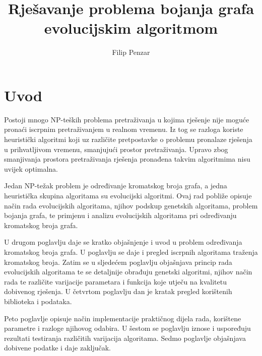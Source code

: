 \documentclass[times, utf8, zavrsni]{fer}
\begin{document}

\title{Rješavanje problema bojanja grafa evolucijskim algoritmom}

\author{Filip Penzar}

\maketitle


\zahvala{}

\tableofcontents

\chapter{Uvod}
Postoji mnogo NP-teških problema pretraživanja u kojima rješenje nije moguće pronaći iscrpnim pretraživanjem u realnom vremenu. Iz tog se razloga koriste heuristički algoritmi koji uz različite pretpostavke o problemu pronalaze rješenja u prihvatljivom vremenu, smanjujući prostor pretraživanja. Upravo zbog smanjivanja prostora pretraživanja rješenja pronađena takvim algoritmima nisu uvijek optimalna.

Jedan NP-težak problem je određivanje kromatskog broja grafa, a jedna heuristička skupina algoritama su evolucijski algoritmi. Ovaj rad pobliže opisuje način rada evolucijskih algoritama, njihov podskup genetskih algoritama, problem bojanja grafa, te primjenu i analizu evolucijskih algoritama pri određivanju kromatskog broja grafa.

U drugom poglavlju daje se kratko objašnjenje i uvod u problem određivanja kromatskog broja grafa. U poglavlju se daje i pregled iscrpnih algoritama traženja kromatskog broja. Zatim se u sljedećem poglavlju objašnjava princip rada evolucijskih algoritama te se detaljnije obrađuju genetski algoritmi, njihov način rada te različite varijacije parametara i funkcija koje utječu na kvalitetu dobivenog rješenja. U četvrtom poglavlju dan je kratak pregled korištenih biblioteka i podataka. 

Peto poglavlje opisuje način implementacije praktičnog dijela rada, korištene parametre i razloge njihovog odabira. U šestom se poglavlju iznose i uspoređuju rezultati testiranja različitih varijacija algoritama. Sedmo poglavlje objašnjava dobivene podatke i daje zaključak.
\end{document}
